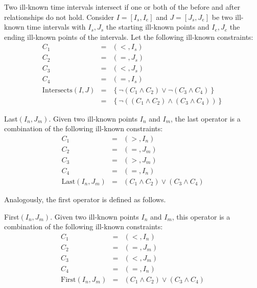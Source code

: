\begin{definition}
 \label{def:ik-intersects}
Two ill-known time intervals intersect if one or both of the before and after relationships do not hold. Consider $I = \left[I_s, I_e \right]$ and $J = \left[J_s, J_e \right]$ be two ill-known time intervals with $I_s, J_s$ the starting ill-known points and $I_e, J_e$ the ending ill-known points of the intervals. Let the following ill-known constraints:
\begin{align}
 \label{eq:ik-intersects}
C_1 &=& \left(<, I_s \right)  \\
C_2 &=& \left(=, J_s \right) \\
C_3 &=& \left(<, J_s \right) \\
C_4 &=& \left(=, I_s \right) \\
\mbox{Intersects}\left(I, J\right) &=& \left \lbrace \neg \left(C_1 \wedge C_2 \right) \vee  \neg \left( C_3 \wedge C_4 \right)  \right \rbrace \\
\nonumber
&=& \left \lbrace \neg \left( \left(C_1 \wedge C_2 \right) \wedge \left(C_3 \wedge C_4 \right)  \right)\right \rbrace
\end{align}
\end{definition}


\begin{definition}
 \label{def:ik-last}
Last$\left(I_n, J_m \right)$. Given two ill-known points $I_n$ and $I_m$, the last operator is a combination of the following ill-known constraints:
\begin{align}
 \label{eq:il-last}
C_1 &=& \left(>, I_n \right) \\
C_2 &=& \left(=, J_m \right) \\
C_3 &=& \left(>, J_m \right) \\
C_4 &=& \left(=, I_n \right) \\
\mbox{Last}\left(I_n, J_m \right) &=& \left(C_1 \wedge C_2  \right) \vee \left(C_3 \wedge C_4 \right)
\end{align}
\end{definition}

Analogously, the first operator is defined as follows.
\begin{definition}
 \label{def:ik-first}
First$\left(I_n, J_m \right)$. Given two ill-known points $I_n$ and $I_m$, this operator is a combination of the following ill-known constraints:
\begin{align}
 \label{eq:ik-first}
C_1 &=& \left(<, I_n \right)\\
C_2 &=& \left(=, J_m \right)\\
C_3 &=& \left(<, J_m \right) \\
C_4 &=& \left(=, I_n \right) \\
\mbox{First}\left(I_n, J_m \right) &=& \left(C_1 \wedge C_2  \right) \vee \left(C_3 \wedge C_4 \right)
\end{align}
\end{definition}

